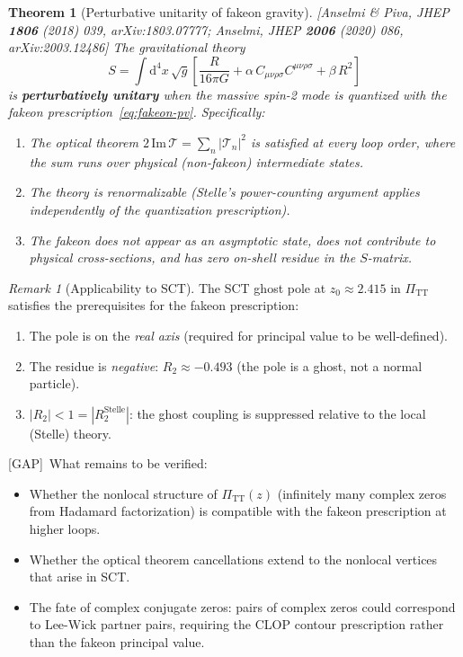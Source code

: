 \documentclass[12pt,a4paper]{article}
\newtheorem{theorem}[proposition]{Theorem}
\theoremstyle{definition}
\theoremstyle{remark}
\newtheorem{remark}[proposition]{Remark}
\newcommand{\Weylsq}{C_{\mu\nu\rho\sigma}C^{\mu\nu\rho\sigma}}
\newcommand{\dd}{\mathrm{d}}
\newcommand{\fromlit}[1]{\textcolor{blue!70!black}{\textsf{[#1]}}}
\newcommand{\gap}{\textcolor{red!80!black}{\textsf{[GAP]}}}
\begin{document}
\begin{theorem}[Perturbative unitarity of fakeon gravity]
\label{thm:anselmi-unitarity}
\fromlit{Anselmi \& Piva, JHEP \textbf{1806} (2018) 039,
arXiv:1803.07777; Anselmi, JHEP \textbf{2006} (2020) 086,
arXiv:2003.12486}
The gravitational theory
\begin{equation}\label{eq:stelle-action}
  S = \int \dd^4 x\,\sqrt{g}\left[
    \frac{R}{16\pi G} + \alpha\,\Weylsq + \beta\,R^2
  \right]
\end{equation}
is \textbf{perturbatively unitary} when the massive spin-2 mode is
quantized with the fakeon prescription~\eqref{eq:fakeon-pv}.
Specifically:
\begin{enumerate}[nosep,label=(\roman*)]
  \item The optical theorem $2\,\mathrm{Im}\,\mathcal{T}
    = \sum_n |\mathcal{T}_n|^2$ is satisfied at every loop order,
    where the sum runs over \emph{physical} (non-fakeon) intermediate
    states.
  \item The theory is renormalizable (Stelle's power-counting argument
    applies independently of the quantization prescription).
  \item The fakeon does not appear as an asymptotic state, does not
    contribute to physical cross-sections, and has zero on-shell
    residue in the $S$-matrix.
\end{enumerate}
\end{theorem}

\begin{remark}[Applicability to SCT]
\label{rem:fakeon-sct}
The SCT ghost pole at $z_0 \approx 2.415$ in $\Pi_{\mathrm{TT}}$
satisfies the prerequisites for the fakeon prescription:
\begin{enumerate}[nosep]
  \item The pole is on the \emph{real axis} (required for principal
    value to be well-defined).
  \item The residue is \emph{negative}: $R_2 \approx -0.493$ (the pole
    is a ghost, not a normal particle).
  \item $|R_2| < 1 = |R_2^{\mathrm{Stelle}}|$: the ghost coupling is
    suppressed relative to the local (Stelle) theory.
\end{enumerate}
\gap\ What remains to be verified:
\begin{itemize}[nosep]
  \item Whether the nonlocal structure of $\Pi_{\mathrm{TT}}(z)$
    (infinitely many complex zeros from Hadamard factorization) is
    compatible with the fakeon prescription at higher loops.
  \item Whether the optical theorem cancellations extend to the
    nonlocal vertices that arise in SCT.
  \item The fate of complex conjugate zeros: pairs of complex zeros
    could correspond to Lee-Wick partner pairs, requiring the CLOP
    contour prescription rather than the fakeon principal value.
\end{itemize}
\end{remark}
\end{document}
